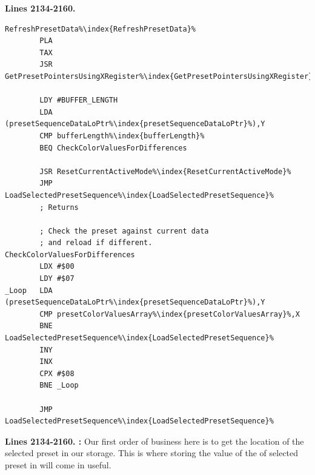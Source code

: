 \clearpage
\textbf{Lines 2134-2160. } 
\begin{lstlisting}[escapechar=\%]
RefreshPresetData%\index{RefreshPresetData}%    
        PLA 
        TAX 
        JSR GetPresetPointersUsingXRegister%\index{GetPresetPointersUsingXRegister}%

        LDY #BUFFER_LENGTH
        LDA (presetSequenceDataLoPtr%\index{presetSequenceDataLoPtr}%),Y
        CMP bufferLength%\index{bufferLength}%
        BEQ CheckColorValuesForDifferences

        JSR ResetCurrentActiveMode%\index{ResetCurrentActiveMode}%
        JMP LoadSelectedPresetSequence%\index{LoadSelectedPresetSequence}%
        ; Returns

        ; Check the preset against current data
        ; and reload if different.
CheckColorValuesForDifferences   
        LDX #$00
        LDY #$07
_Loop   LDA (presetSequenceDataLoPtr%\index{presetSequenceDataLoPtr}%),Y
        CMP presetColorValuesArray%\index{presetColorValuesArray}%,X
        BNE LoadSelectedPresetSequence%\index{LoadSelectedPresetSequence}%
        INY 
        INX 
        CPX #$08
        BNE _Loop

        JMP LoadSelectedPresetSequence%\index{LoadSelectedPresetSequence}%

\end{lstlisting}
\clearpage


\textbf{Lines 2134-2160. :} Our first order of business here is to get the location of the selected preset
in our storage. This is where storing the value of the of selected preset in  will come in useful. 

